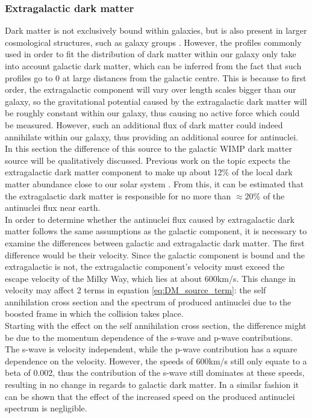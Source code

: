 \subsubsection{Extragalactic dark matter}
Dark matter is not exclusively bound within galaxies, but is also present in larger cosmological structures, such as galaxy groups \cite{Baushev_2013}. However, the profiles commonly used in order to fit the distribution of dark matter within our galaxy only take into account galactic dark matter, which can be inferred from the fact that such profiles go to 0 at large distances from the galactic centre. This is because to first order, the extragalactic component will vary over length scales bigger than our galaxy, so the gravitational potential caused by the extragalactic dark matter will be roughly constant within our galaxy, thus causing no active force which could be measured. However, such an additional flux of dark matter could indeed annihilate within our galaxy, thus providing an additional source for antinuclei. In this section the difference of this source to the galactic WIMP dark matter source will be qualitatively discussed. Previous work on the topic expects the extragalactic dark matter component to make up about 12\% of the local dark matter abundance close to our solar system \cite{Baushev_2013}. From this, it can be estimated that the extragalactic dark matter is responsible for no more than $\approx 20$\% of the antinuclei flux near earth. \\ 

In order to determine whether the antinuclei flux caused by extragalactic dark matter follows the same assumptions as the galactic component, it is necessary to examine the differences between galactic and extragalactic dark matter. The first difference would be their velocity. Since the galactic component is bound and the extragalactic is not, the extragalactic component's velocity must exceed the escape velocity of the Milky Way, which lies at about 600km/s. This change in velocity may affect 2 terms in equation \ref{eq:DM_source_term}: the self annihilation cross section and the spectrum of produced antinuclei due to the boosted frame in which the collision takes place. \\
Starting with the effect on the self annihilation cross section, the difference might be due to the momentum dependence of the s-wave and p-wave contributions. The s-wave is velocity independent, while the p-wave contribution has a square dependence on the velocity. However, the speeds of 600km/s still only equate to a beta of 0.002, thus the contribution of the s-wave still dominates at these speeds, resulting in no change in regards to galactic dark matter. In a similar fashion it can be shown that the effect of the increased speed on the produced antinuclei spectrum is negligible. \\

